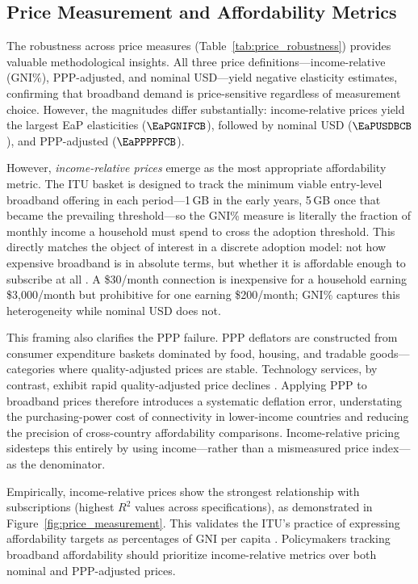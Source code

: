 \subsection{Price Measurement and Affordability Metrics}

The robustness across price measures (Table~\ref{tab:price_robustness}) provides valuable methodological insights. All three price definitions---income-relative (GNI\%), PPP-adjusted, and nominal USD---yield negative elasticity estimates, confirming that broadband demand is price-sensitive regardless of measurement choice. However, the magnitudes differ substantially: income-relative prices yield the largest EaP elasticities ($\EaPGNIFCB$), followed by nominal USD ($\EaPUSDBCB$), and PPP-adjusted ($\EaPPPPFCB$).

However, \textit{income-relative prices} emerge as the most appropriate affordability metric. The ITU basket is designed to track the minimum viable entry-level broadband offering in each period---1\,GB in the early years, 5\,GB once that became the prevailing threshold---so the GNI\% measure is literally the fraction of monthly income a household must spend to cross the adoption threshold. This directly matches the object of interest in a discrete adoption model: not how expensive broadband is in absolute terms, but whether it is affordable enough to subscribe at all \citep{deaton1980almost}. A \$30/month connection is inexpensive for a household earning \$3{,}000/month but prohibitive for one earning \$200/month; GNI\% captures this heterogeneity while nominal USD does not.

This framing also clarifies the PPP failure. PPP deflators are constructed from consumer expenditure baskets dominated by food, 
housing, and tradable goods---categories where quality-adjusted prices are stable. 
Technology services, by contrast, exhibit rapid quality-adjusted price declines \citep{schreyer2002oecd}. 
Applying PPP to broadband prices therefore introduces a systematic deflation error, 
understating the purchasing-power cost of connectivity in lower-income countries and 
reducing the precision of cross-country affordability comparisons. 
Income-relative pricing sidesteps this entirely by using income---rather than a mismeasured price index---as the denominator.

Empirically, income-relative prices show the strongest relationship with subscriptions (highest $R^2$ values across specifications), 
as demonstrated in Figure~\ref{fig:price_measurement}. This validates the ITU's practice of expressing 
affordability targets as percentages of GNI per capita \citep{itu2024data}. Policymakers tracking broadband affordability 
should prioritize income-relative metrics over both nominal and PPP-adjusted prices.

